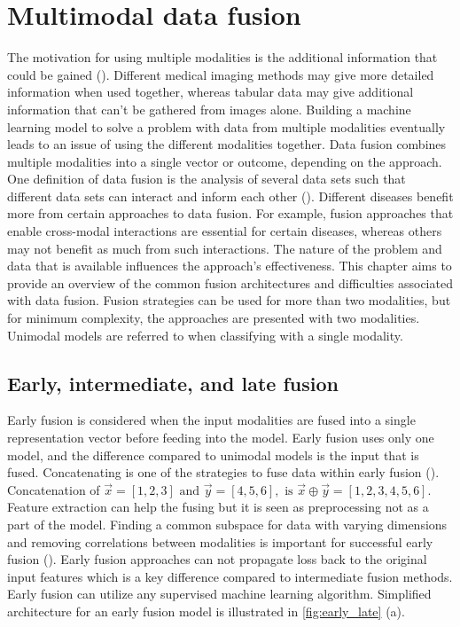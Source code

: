 \chapter{Multimodal data fusion\label{results}}

The motivation for using multiple modalities is the additional information that could be gained (\cite{8103116}). Different medical imaging methods may give more detailed information when used together, whereas tabular data may give additional information that can't be gathered from images alone. Building a machine learning model to solve a problem with data from multiple modalities eventually leads to an issue of using the different modalities together. Data fusion combines multiple modalities into a single vector or outcome, depending on the approach. One definition of data fusion is the analysis of several data sets such that different data sets can interact and inform each other (\cite{7214350}). Different diseases benefit more from certain approaches to data fusion. For example, fusion approaches that enable cross-modal interactions are essential for certain diseases, whereas others may not benefit as much from such interactions. The nature of the problem and data that is available influences the approach's effectiveness. This chapter aims to provide an overview of the common fusion architectures and difficulties associated with data fusion. Fusion strategies can be used for more than two modalities, but for minimum complexity, the approaches are presented with two modalities. Unimodal models are referred to when classifying with a single modality.

\section{Early, intermediate, and late fusion}


Early fusion is considered when the input modalities are fused into a single representation vector before feeding into the model. Early fusion uses only one model, and the difference compared to unimodal models is the input that is fused. Concatenating is one of the strategies to fuse data within early fusion (\cite{10.1093/bib/bbab569}). Concatenation of \(\vec{x} = [1, 2, 3] \text{ and } \vec{y} = [4, 5, 6],\text{ is }  \vec{x} \oplus \vec{y} = [1, 2, 3, 4, 5, 6].\) Feature extraction can help the fusing but it is seen as preprocessing not as a part of the model. Finding a common subspace for data with varying dimensions and removing correlations between modalities is important for successful early fusion (\cite{8103116}). Early fusion approaches can not propagate loss back to the original input features which is a key difference compared to intermediate fusion methods. Early fusion can utilize any supervised machine learning algorithm. Simplified architecture for an early fusion model is illustrated in \ref{fig:early_late} (a).

